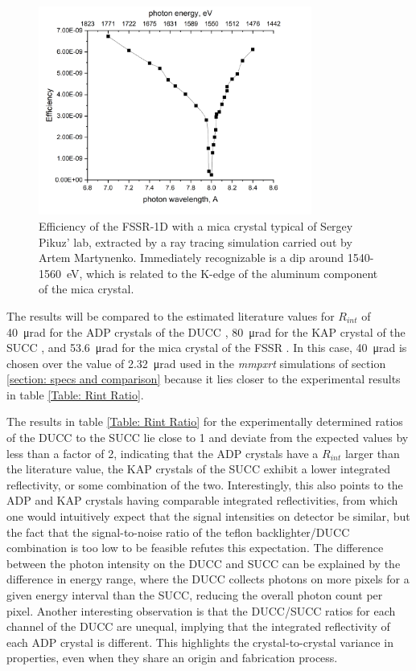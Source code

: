 \begin{figure}[H]
	\centering
	\includegraphics[width=0.8\textwidth]{Data_Analysis/efficiency_graph.png}
	\caption{Efficiency of the FSSR-1D with a mica crystal typical of Sergey Pikuz' lab, extracted by a ray tracing simulation carried out by Artem Martynenko. Immediately recognizable is a dip around 1540-\SI{1560}{\electronvolt}, which is related to the K-edge of the aluminum component of the mica crystal.}
	\label{fig: efficiency graph}
\end{figure}

The results will be compared to the estimated literature values for $R_{int}$ of \SI{40}{\micro\radian} for the ADP crystals of the DUCC \citep{gilfrich1975integral}, \SI{80}{\micro\radian} for the KAP crystal of the SUCC \citep{loisel2016measurement}, and \SI{53.6}{\micro\radian} for the mica crystal of the FSSR \citep{holzer1998flat}. In this case, \SI{40}{\micro\radian} is chosen over the value of \SI{2.32}{\micro\radian} used in the \textit{mmpxrt} simulations of section \ref{section: specs and comparison} because it lies closer to the experimental results in table \ref{Table: Rint Ratio}.

The results in table \ref{Table: Rint Ratio} for the experimentally determined ratios of the DUCC to the SUCC lie close to 1 and deviate from the expected values by less than a factor of 2, indicating that the ADP crystals have a $R_{int}$ larger than the literature value, the KAP crystals of the SUCC exhibit a lower integrated reflectivity, or some combination of the two. Interestingly, this also points to the ADP and KAP crystals having comparable integrated reflectivities, from which one would intuitively expect that the signal intensities on detector be similar, but the fact that the signal-to-noise ratio of the teflon backlighter/DUCC combination is too low to be feasible refutes this expectation. The difference between the photon intensity on the DUCC and SUCC can be explained by the difference in energy range, where the DUCC collects photons on more pixels for a given energy interval than the SUCC, reducing the overall photon count per pixel. Another interesting observation is that the DUCC/SUCC ratios for each channel of the DUCC are unequal, implying that the integrated reflectivity of each ADP crystal is different. This highlights the crystal-to-crystal variance in properties, even when they share an origin and fabrication process.

